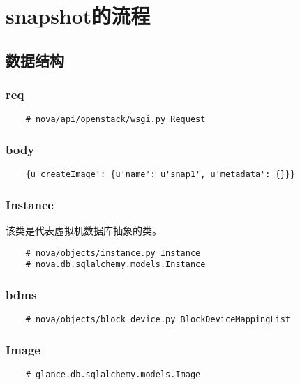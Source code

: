 \documentclass[a4paper,left=1.5cm,right=1.5cm,11pt]{article}
\begin{document}
\tableofcontents

\clearpage

\section{snapshot的流程}
\subsection{数据结构}
\subsubsection{req}
    \begin{lstlisting}
    # nova/api/openstack/wsgi.py Request
    \end{lstlisting}

\subsubsection{body}
    \begin{lstlisting}
    {u'createImage': {u'name': u'snap1', u'metadata': {}}}
    \end{lstlisting}

\subsubsection{Instance}
    该类是代表虚拟机数据库抽象的类。

    \begin{lstlisting}
    # nova/objects/instance.py Instance
    # nova.db.sqlalchemy.models.Instance
    \end{lstlisting}

\subsubsection{bdms}
    \begin{lstlisting}
    # nova/objects/block_device.py BlockDeviceMappingList
    \end{lstlisting}

\subsubsection{Image}
    \begin{lstlisting}
    # glance.db.sqlalchemy.models.Image
    \end{lstlisting}
\end{document}
